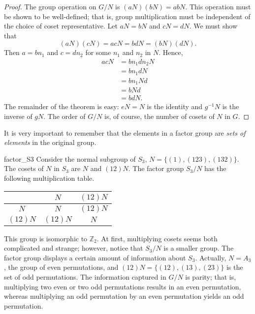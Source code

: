  
\begin{proof}
The group operation on $G/N$ is $(a N ) (b N)= a b N$.  This operation
must be shown to be well-defined; that is, group multiplication must
be independent of the choice of  coset representative. Let $aN = bN$
and $cN = dN$. We must show that
\[
(aN) (cN) = acN = bd N = (b N)(d N).
\]
Then $a = b n_1$ and $c = d n_2$ for some $n_1$ and $n_2$ in
$N$. Hence, 
\begin{align*}
acN & = b n_1 d n_2 N \\
& = b n_1 d N \\
& = b n_1 N d \\
& = b N d \\
& = b d N.
\end{align*}
The remainder of the theorem is easy: $eN = N$ is the identity and
$g^{-1} N$ is the inverse of $gN$. The order of $G/N$ is, of course,
the number of cosets of $N$ in $G$. 
\end{proof}
 
 
\medskip
 
 
It is very important to remember that the elements in a factor group are
\emph{sets of elements} in the original group. 
 
 

 
 
\begin{example}{factor_S3}
Consider the normal subgroup of $S_3$, $N = \{ (1), (123), (132)  \}$.
The cosets of $N$ in $S_3$ are $N$ and $(12) N$. The factor group $S_3
/ N$ has the following multiplication table.
\begin{center}
\begin{tabular}{c|cc}
         & $N$      & $(12) N$ \\
\hline
$N$      & $N$      & $(12) N$ \\
$(12) N$ & $(12) N$ & $N$
\end{tabular}
\end{center}
This group is isomorphic to ${\mathbb Z}_2$. At first, multiplying cosets
seems both complicated and strange; however, notice that  $S_3 / N$ is
a smaller group. The factor group displays a certain amount of
information about $S_3$.  Actually, $N = A_3$, the group of even
permutations, and $(12) N = \{ (12), (13), (23) \}$ is the set of odd
permutations. The information captured in $G/N$ is parity; that is,
multiplying two even or two odd permutations results in an even
permutation, whereas multiplying an odd permutation by an even
permutation yields an odd permutation.
\end{example}
 
